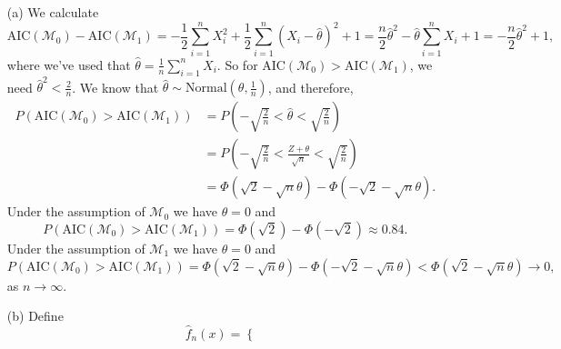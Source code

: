 \begin{itemize}
    \item[(a)] We calculate
        \begin{equation*}
            \mathrm{AIC}(\mathcal{M}_0) - \mathrm{AIC}(\mathcal{M}_1)
                 = -\frac{1}{2}\sum_{i = 1}^n X_i^2 + \frac{1}{2} \sum_{i = 1}^n (X_i - \hat{\theta})^2 + 1
                 = \frac{n}{2} \hat{\theta}^2 - \hat{\theta} \sum_{i = 1}^n X_i + 1
                 = -\frac{n}{2} \hat{\theta}^2 + 1,
        \end{equation*}
        where we've used that $\hat{\theta} = \frac{1}{n} \sum_{i = 1}^n X_i$.
        So for $\mathrm{AIC}(\mathcal{M}_0) > \mathrm{AIC}(\mathcal{M}_1)$, we need $\hat{\theta}^2 < \frac{2}{n}$.
        We know that $\hat{\theta} \sim \mathrm{Normal}(\theta, \frac{1}{n})$, and therefore,
        \begin{equation*}
            \begin{split}
                P(\mathrm{AIC}(\mathcal{M}_0) > \mathrm{AIC}(\mathcal{M}_1))
                    &= P\left(-\sqrt{\frac{2}{n}} < \hat{\theta} < \sqrt{\frac{2}{n}}\right) \\
                    &= P\left(-\sqrt{\frac{2}{n}} < \frac{Z + \theta}{\sqrt{n}} < \sqrt{\frac{2}{n}}\right) \\
                    &= \Phi(\sqrt{2} - \sqrt{n}\theta) - \Phi(-\sqrt{2} - \sqrt{n}\theta).
            \end{split}
        \end{equation*}
        Under the assumption of $\mathcal{M}_0$ we have $\theta = 0$ and
        \begin{equation*}
            P(\mathrm{AIC}(\mathcal{M}_0) > \mathrm{AIC}(\mathcal{M}_1))
                = \Phi(\sqrt{2}) - \Phi(-\sqrt{2})
                \approx 0.84.
        \end{equation*}
        Under the assumption of $\mathcal{M}_1$ we have $\theta = 0$ and
        \begin{equation*}
            P(\mathrm{AIC}(\mathcal{M}_0) > \mathrm{AIC}(\mathcal{M}_1))
                = \Phi(\sqrt{2} - \sqrt{n}\theta) - \Phi(-\sqrt{2} - \sqrt{n}\theta)
                < \Phi(\sqrt{2} - \sqrt{n}\theta)
                \to 0,
        \end{equation*}
        as $n \to \infty$.
    \item[(b)] Define
        \begin{equation*}
            \hat{f}_n(x) = \left\{ \begin{matrix}

\end{matrix}
\end{equation*}
\end{itemize}
